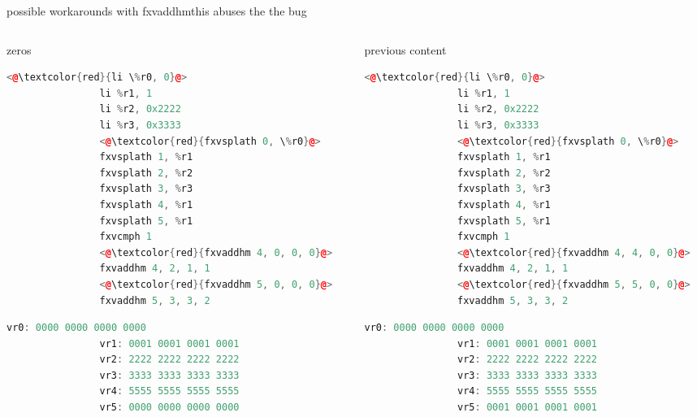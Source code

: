 \documentclass[10pt]{beamer}
\begin{document}
\begin{frame}[fragile]{possible workarounds with fxvaddhm}{this abuses the the bug}
	\begin{columns}[t]
		\begin{column}{0.3\textwidth}
			\begin{block}{zeros}
			\begin{lstlisting}[language=C++,basicstyle=\ttfamily\scriptsize,keywordstyle=\color{red}]
				<@\textcolor{red}{li \%r0, 0}@>
				li %r1, 1
				li %r2, 0x2222
				li %r3, 0x3333
				<@\textcolor{red}{fxvsplath 0, \%r0}@>
				fxvsplath 1, %r1
				fxvsplath 2, %r2
				fxvsplath 3, %r3
				fxvsplath 4, %r1
				fxvsplath 5, %r1
				fxvcmph 1
				<@\textcolor{red}{fxvaddhm 4, 0, 0, 0}@>
				fxvaddhm 4, 2, 1, 1
				<@\textcolor{red}{fxvaddhm 5, 0, 0, 0}@>
				fxvaddhm 5, 3, 3, 2
			\end{lstlisting}
      		\begin{lstlisting}[language=C++,basicstyle=\fontsize{5}{7}\selectfont\ttfamily,keywordstyle=\color{red}]
				vr0: 0000 0000 0000 0000
				vr1: 0001 0001 0001 0001
				vr2: 2222 2222 2222 2222
				vr3: 3333 3333 3333 3333
				vr4: 5555 5555 5555 5555
				vr5: 0000 0000 0000 0000
			\end{lstlisting}
			\end{block}
    	\end{column}
    	\begin{column}{0.3\textwidth}
    		\begin{block}{previous content}
    		\begin{lstlisting}[language=C++,basicstyle=\ttfamily\scriptsize,keywordstyle=\color{red}]
				<@\textcolor{red}{li \%r0, 0}@>
				li %r1, 1
				li %r2, 0x2222
				li %r3, 0x3333
				<@\textcolor{red}{fxvsplath 0, \%r0}@>
				fxvsplath 1, %r1
				fxvsplath 2, %r2
				fxvsplath 3, %r3
				fxvsplath 4, %r1
				fxvsplath 5, %r1
				fxvcmph 1
				<@\textcolor{red}{fxvaddhm 4, 4, 0, 0}@>
				fxvaddhm 4, 2, 1, 1
				<@\textcolor{red}{fxvaddhm 5, 5, 0, 0}@>
				fxvaddhm 5, 3, 3, 2
	\end{lstlisting}
      			\begin{lstlisting}[language=C++,basicstyle=\fontsize{5}{7}\selectfont\ttfamily,keywordstyle=\color{red}]
				vr0: 0000 0000 0000 0000
				vr1: 0001 0001 0001 0001
				vr2: 2222 2222 2222 2222
				vr3: 3333 3333 3333 3333
				vr4: 5555 5555 5555 5555
				vr5: 0001 0001 0001 0001
				\end{lstlisting}
			\end{block}
    	\end{column}

\end{columns}
\end{frame}
\end{document}
